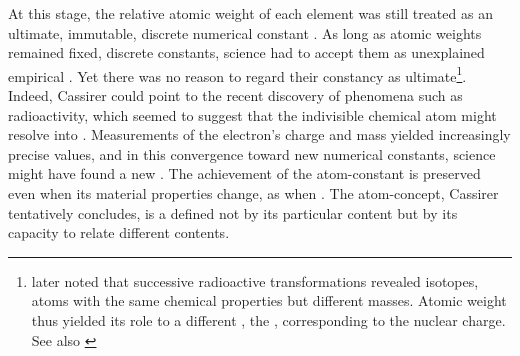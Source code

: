 \documentclass[submitted,12pt]{article}
\begin{document}
At this stage, the relative atomic weight of each element was still treated as an ultimate, immutable, discrete numerical constant . As long as atomic weights remained fixed, discrete constants, science had to accept them as unexplained empirical  . Yet there was no reason to regard their constancy as ultimate\footnote{\citet[516/442--43]{Cassirer1910} later noted that successive radioactive transformations revealed isotopes, atoms with the same chemical properties but different masses. Atomic weight thus yielded its role to a different , the , corresponding to the nuclear charge. See also \citet{Cassirer1936a}}. Indeed, Cassirer could point to the recent discovery of phenomena such as radioactivity, which seemed to suggest that the indivisible chemical atom might resolve into  . Measurements of the electron's charge and mass yielded increasingly precise values, and in this convergence toward new numerical constants, science might have found a new  . The achievement  of the atom-constant is preserved even when its material properties change, as when  . The atom-concept, Cassirer tentatively concludes, is a    defined not by its particular content but by its capacity to relate different contents.

% 




\end{document}

